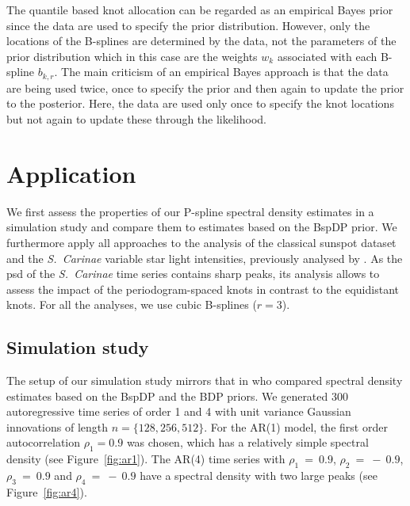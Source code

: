 \documentclass[twocolumn,final]{svjour3}
\begin{document}
The quantile based knot allocation can be regarded as an empirical Bayes prior since the data are used to specify the prior distribution.  However, only the locations of the B-splines are determined by the data, not the parameters of the prior distribution which in this case are the weights $w_k$ associated with each B-spline $b_{k,r}$.  The main criticism of an empirical Bayes approach is that the data are being used twice, once to specify the prior and then again to update the prior to the posterior. Here, the data are used only once to specify the knot locations but not again to update these through the likelihood.



\section{Application}
\label{sec:application}

We first assess the properties of our P-spline spectral density estimates in a simulation study and compare them to estimates based on the BspDP prior. We furthermore apply all approaches to the
analysis of the classical sunspot dataset  and the {\it S.\ Carinae} variable star light intensities, previously analysed by \cite{Cart:1997,Huerta:1999,Kirch:2018}.  As the psd of the  {\it S.\ Carinae} time series contains sharp peaks, its analysis allows to assess the impact of the periodogram-spaced knots in contrast to the equidistant knots.   For all the analyses, we use cubic B-splines ($r=3$).

\subsection{Simulation study}

The setup of our simulation study mirrors that  in \cite{Edwards2019} who  compared spectral density estimates based on the BspDP and the BDP priors. 
We generated  300  autoregressive time series of order 1 and 4 with unit variance Gaussian innovations of length $n = \{128, 256, 512\}$.
For the AR(1) model, the  first  order autocorrelation $\rho_1 = 0.9$ was chosen, which has a relatively simple spectral density (see Figure~\ref{fig:ar1}).  The AR(4) time series with $\rho_1~=~0.9$, $\rho_2~=~-~0.9$, $\rho_3~=~0.9$ and $\rho_4~=~-~0.9$ have a spectral density with two large peaks (see Figure~\ref{fig:ar4}).  
\end{document}
